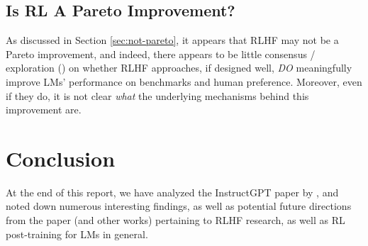 \documentclass{article} %
\begin{document}
\subsection{Is RL A Pareto Improvement?}
As discussed in Section \ref{sec:not-pareto}, it appears that 
RLHF may not be a Pareto improvement, and indeed, 
there appears to be little consensus / exploration (\cite{Lin-et-al-2024, Berg-et-al-2024}) on whether
RLHF approaches, if designed well, \textit{DO} meaningfully improve LMs' performance on benchmarks
and human preference. Moreover, even if they do, it is not clear 
\textit{what} the underlying mechanisms behind this improvement are.

\section{Conclusion}
At the end of this report, we have analyzed the InstructGPT paper by \cite{InstructGPT-2022},
and noted down numerous interesting findings, as well as potential future directions
from the paper (and other works) pertaining to RLHF research, as well as RL post-training for LMs in general.




\appendix
\end{document}
